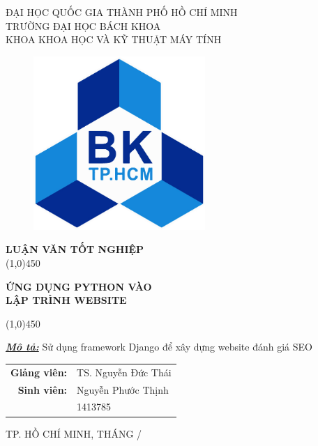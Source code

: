 \begin{titlepage}
	\begin{center}
		\large ĐẠI HỌC QUỐC GIA THÀNH PHỐ HỒ CHÍ MINH\\TRƯỜNG ĐẠI HỌC BÁCH KHOA\\KHOA KHOA HỌC VÀ KỸ THUẬT MÁY TÍNH
	\end{center}
	\begin{figure}[h!]
		\begin{center}
			\includegraphics[width=65mm]{images/logobk.jpg}
		\end{center}
	\end{figure}
	\textbf{\large LUẬN VĂN TỐT NGHIỆP}\\
	\line(1,0){450}
	\begin{center}
		\textbf{\Huge ỨNG DỤNG PYTHON VÀO\\LẬP TRÌNH WEBSITE}
	\end{center}
	\line(1,0){450}
	\begin{flushleft}
		\large \textit{\textbf{\underline{Mô tả:}}} Sử dụng framework Django để xây dựng website đánh giá SEO
	\end{flushleft}
	\vspace{10mm}
	\begin{table}[h!]
		\raggedleft
		\large
		\begin{tabular}{rl}
			\textbf{Giảng viên:}	 & TS. Nguyễn Đức Thái\\
			\textbf{Sinh viên:} & Nguyễn Phước Thịnh\\
			& 1413785
		\end{tabular}
	\end{table}
	\vfill
	\begin{center}
		\large TP. HỒ CHÍ MINH, THÁNG \the\month /\the\year
	\end{center}
\end{titlepage}